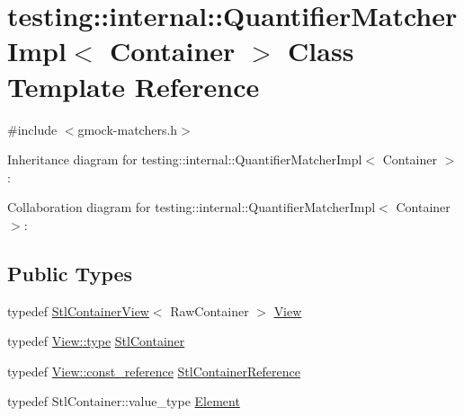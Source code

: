\hypertarget{classtesting_1_1internal_1_1_quantifier_matcher_impl}{}\section{testing\+:\+:internal\+:\+:Quantifier\+Matcher\+Impl$<$ Container $>$ Class Template Reference}
\label{classtesting_1_1internal_1_1_quantifier_matcher_impl}


{\ttfamily \#include $<$gmock-\/matchers.\+h$>$}



Inheritance diagram for testing\+:\+:internal\+:\+:Quantifier\+Matcher\+Impl$<$ Container $>$\+:


Collaboration diagram for testing\+:\+:internal\+:\+:Quantifier\+Matcher\+Impl$<$ Container $>$\+:
\subsection*{Public Types}
\begin{DoxyCompactItemize}
\item 
typedef \hyperlink{classtesting_1_1internal_1_1_stl_container_view}{Stl\+Container\+View}$<$ Raw\+Container $>$ \hyperlink{classtesting_1_1internal_1_1_quantifier_matcher_impl_aa1e6b1653b6fdee1b0cfc4c58a9059e6}{View}
\item 
typedef \hyperlink{classtesting_1_1internal_1_1_stl_container_view_a2b2c63a6dcdbfe63fb0ee121ebf463ba}{View\+::type} \hyperlink{classtesting_1_1internal_1_1_quantifier_matcher_impl_a7faa9a49c627e6db66e0ff9cdc88b6fc}{Stl\+Container}
\item 
typedef \hyperlink{classtesting_1_1internal_1_1_stl_container_view_a9cd4f6ed689b3938cdb7b3c4cbf1b36b}{View\+::const\+\_\+reference} \hyperlink{classtesting_1_1internal_1_1_quantifier_matcher_impl_a341dd7815b3c6090d935026daac6e938}{Stl\+Container\+Reference}
\item 
typedef Stl\+Container\+::value\+\_\+type \hyperlink{classtesting_1_1internal_1_1_quantifier_matcher_impl_a6f73e2e5fa853f8b5fdd33d6a1811f9e}{Element}
\end{DoxyCompactItemize}
